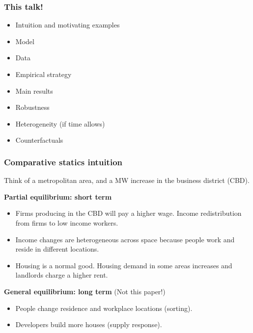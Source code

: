 \documentclass[aspectratio=169]{beamer}
\begin{document}
\begin{frame}
	\frametitle{This talk!}
	
	\begin{itemize}
		\vspace{.5mm} \item Intuition and motivating examples
                 \vspace{.5mm} \item Model 
		\vspace{.5mm} \item Data
		\vspace{.5mm} \item 	Empirical strategy
		\vspace{.5mm} \item Main results 
		\vspace{.5mm} \item Robustness
		\vspace{.5mm} \item Heterogeneity (if time allows)
		\vspace{.5mm} \item Counterfactuals
	\end{itemize}
\end{frame}

\begin{frame}
	\frametitle{Comparative statics intuition}
    
    \vspace{3mm}
    
	Think of a metropolitan area, and a MW increase in the business district (CBD). 
	
	\vspace{3mm}
	
    \textbf{Partial equilibrium: short term}
	\begin{itemize}
		\vspace{.5mm} \item Firms producing in the CBD will pay a higher wage. Income redistribution 
		from firms to low income workers.
		\vspace{.5mm} \item Income changes are heterogeneous across space because people work 
		and reside in different locations.
		\vspace{.5mm} \item Housing is a normal good. Housing demand in some areas increases 
		and landlords charge a higher rent.
	\end{itemize}

	\pause
	\vspace{3mm}
	\textbf{General equilibrium: long term} (Not this paper!)
	\begin{itemize}
	\vspace{.5mm} \item People change residence and workplace locations (sorting).
	\vspace{.5mm} \item Developers build more houses (supply response).
\end{itemize}
\end{frame}
\end{document}
